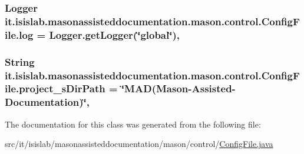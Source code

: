 \hypertarget{classit_1_1isislab_1_1masonassisteddocumentation_1_1mason_1_1control_1_1_config_file_a233d40b4ec2b6609570825bedaa9f6e5}{
\subsubsection[{log}]{\setlength{\rightskip}{0pt plus 5cm}Logger it.\-isislab.\-masonassisteddocumentation.\-mason.\-control.\-Config\-File.\-log = Logger.\-get\-Logger(\char`\"{}global\char`\"{})\hspace{0.3cm}{\ttfamily [static]}, {\ttfamily [private]}}}\label{classit_1_1isislab_1_1masonassisteddocumentation_1_1mason_1_1control_1_1_config_file_a233d40b4ec2b6609570825bedaa9f6e5}
\hypertarget{classit_1_1isislab_1_1masonassisteddocumentation_1_1mason_1_1control_1_1_config_file_a91a0d496b1cb5b351d2b0452fa71f763}{
\subsubsection[{project\-\_\-s\-Dir\-Path}]{\setlength{\rightskip}{0pt plus 5cm}String it.\-isislab.\-masonassisteddocumentation.\-mason.\-control.\-Config\-File.\-project\-\_\-s\-Dir\-Path = \char`\"{}M\-A\-D(Mason-\/Assisted-\/Documentation)\char`\"{}\hspace{0.3cm}{\ttfamily [static]}, {\ttfamily [private]}}}\label{classit_1_1isislab_1_1masonassisteddocumentation_1_1mason_1_1control_1_1_config_file_a91a0d496b1cb5b351d2b0452fa71f763}


The documentation for this class was generated from the following file\-:\begin{DoxyCompactItemize}
\item 
src/it/isislab/masonassisteddocumentation/mason/control/\hyperlink{_config_file_8java}{Config\-File.\-java}\end{DoxyCompactItemize}
